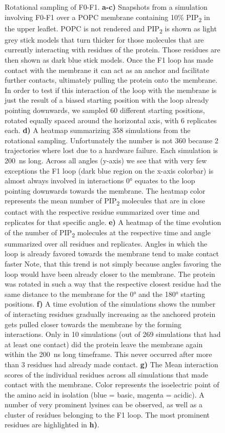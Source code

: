 \documentclass[
  letterpaper,
  DIV=11,
  numbers=noendperiod]{scrartcl}
\begin{document}
\begin{figure}
\caption{\label{fig-loop-importance}Rotational sampling of F0-F1.
\textbf{a-c)} Snapshots from a simulation involving F0-F1 over a POPC
membrane containing 10\% PIP\textsubscript{2} in the upper leaflet. POPC
is not rendered and PIP\textsubscript{2} is shown as light grey stick
models that turn thicker for those molecules that are currently
interacting with residues of the protein. Those residues are then shown
as dark blue stick models. Once the F1 loop has made contact with the
membrane it can act as an anchor and facilitate further contacts,
ultimately pulling the protein onto the membrane. In order to test if
this interaction of the loop with the membrane is just the result of a
biased starting position with the loop already pointing downwards, we
sampled 60 different starting positions, rotated equally spaced around
the horizontal axis, with 6 replicates each. \textbf{d)} A heatmap
summarizing 358 simulations from the rotational sampling. Unfortunately
the number is not 360 because 2 trajectories where lost due to a
hardware failure. Each simulation is 200~ns long. Across all angles
(y-axis) we see that with very few exceptions the F1 loop (dark blue
region on the x-axis colorbar) is almost always involved in interactions
0° equates to the loop pointing downwards towards the membrane. The
heatmap color represents the mean number of PIP\textsubscript{2}
molecules that are in close contact with the respective residue
summarized over time and replicates for that specific angle. \textbf{e)}
A heatmap of the time evolution of the number of PIP\textsubscript{2}
molecules at the respective time and angle summarized over all residues
and replicates. Angles in which the loop is already favored towards the
membrane tend to make contact faster Note, that this trend is not simply
because angles favoring the loop would have been already closer to the
membrane. The protein was rotated in such a way that the respective
closest residue had the same distance to the membrane for the 0° and the
180° starting positions. \textbf{f)} A time evolution of the simulations
shows the number of interacting residues gradually increasing as the
anchored protein gets pulled closer towards the membrane by the forming
interactions. Only in 10 simulations (out of 269 simulations that had at
least one contact) did the protein leave the membrane again within the
200~ns long timeframe. This never occurred after more than 3 residues
had already made contact. \textbf{g)} The Mean interaction scores of the
individual residues across all simulations that made contact with the
membrane. Color represents the isoelectric point of the amino acid in
isolation (blue = basic, magenta = acidic). A number of very prominent
lysines can be observed, as well as a cluster of residues belonging to
the F1 loop. The most prominent residues are highlighted in
\textbf{h)}.}

\end{figure}
\end{document}
